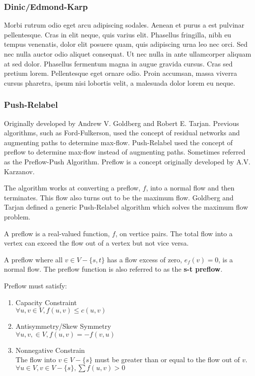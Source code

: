 
\subsubsection{Dinic/Edmond-Karp}
Morbi rutrum odio eget arcu adipiscing sodales. Aenean et purus a est pulvinar pellentesque. Cras in elit neque, quis varius elit. Phasellus fringilla, nibh eu tempus venenatis, dolor elit posuere quam, quis adipiscing urna leo nec orci. Sed nec nulla auctor odio aliquet consequat. Ut nec nulla in ante ullamcorper aliquam at sed dolor. Phasellus fermentum magna in augue gravida cursus. Cras sed pretium lorem. Pellentesque eget ornare odio. Proin accumsan, massa viverra cursus pharetra, ipsum nisi lobortis velit, a malesuada dolor lorem eu neque.


\subsubsection{Push-Relabel}
Originally developed by Andrew V. Goldberg and Robert E. Tarjan. Previous algorithms, such as Ford-Fulkerson, used the concept of residual networks and augmenting paths to determine max-flow.
Push-Relabel used the concept of preflow to determine  max-flow instead of augmenting paths. Sometimes referred as the Preflow-Push Algorithm.
Preflow is a concept originally developed by A.V. Karzanov.

The algorithm works at converting a preflow, $f$, into a normal flow and then terminates. This flow also turns out to be the maximum flow. Goldberg and Tarjan defined a generic Push-Relabel algorithm  which solves the maximum flow problem.

\begin{definition}[Preflow]
	A preflow is a real-valued function, $f$, on vertice pairs. The total flow into a vertex can exceed the flow out of a vertex but not vice versa.
\end{definition}
A preflow where all $v \in V-\{s, t\}$ has a flow excess of zero, $e_f(v) = 0$, is a normal flow. The preflow function is also referred to as the \textbf{s-t preflow}.

Preflow must satisfy:
\begin{enumerate}
	\item Capacity Constraint\\
	$\forall u,v \in V, f(u,v) \leq c(u,v)$
	
	\item Antisymmetry/Skew Symmetry\\
	$\forall u, v, \in V, f(u,v) = -f(v,u)$
	
	\item Nonnegative Constrain\\
	The flow into $v \in V-\{s\}$ must be greater than or equal to the flow out of $v$. $\forall u \in V, v \in V-\{s\}, \sum f(u,v)>0$
\end{enumerate}

